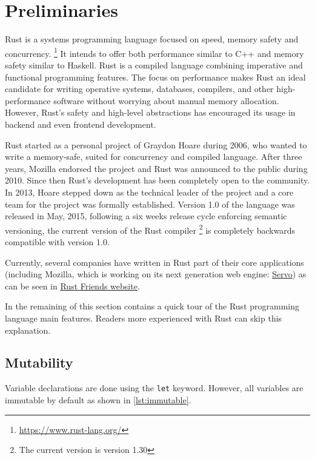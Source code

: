 \chapter{Preliminaries}

\label{chapter:preliminaries}

Rust is a systems programming language focused on speed, memory safety and
concurrency. \footnote{\url{https://www.rust-lang.org/}}  It intends to offer
both performance similar to C++ and memory safety similar to Haskell. Rust is a
compiled language combining imperative and functional programming features. The
focus on performance makes Rust an ideal candidate for writing operative
systems, databases, compilers, and other high-performance software without
worrying about manual memory allocation. However, Rust's safety and high-level
abstractions has encouraged its usage in backend and even frontend development. 

Rust started as a personal project of Graydon Hoare during 2006, who wanted to
write a memory-safe, suited for concurrency and compiled language. After three
years, Mozilla endorsed the project and Rust was announced to the public during
2010. Since then Rust's development has been completely open to the community.
In 2013, Hoare stepped down as the technical leader of the project and a core
team for the project was formally established. \cite{steve_acm} Version 1.0 of
the language was released in May, 2015, following a six weeks release cycle
enforcing semantic versioning, the current version of the Rust compiler
\footnote{The current version is version 1.30} is completely backwards
compatible with version 1.0.

Currently, several companies have written in Rust part of their core
applications (including Mozilla, which is working on its next generation web
engine: \href{https://servo.org/}{Servo}) as can be seen in
\href{https://www.rust-lang.org/en-US/friends.html}{Rust Friends website}.

In the remaining of this section contains a quick tour of the Rust programming
language main features. Readers more experienced with Rust can skip this
explanation.

\section{Mutability}

Variable declarations are done using the \texttt{let} keyword. However, all
variables are immutable by default as shown in \ref{lst:immutable}.

